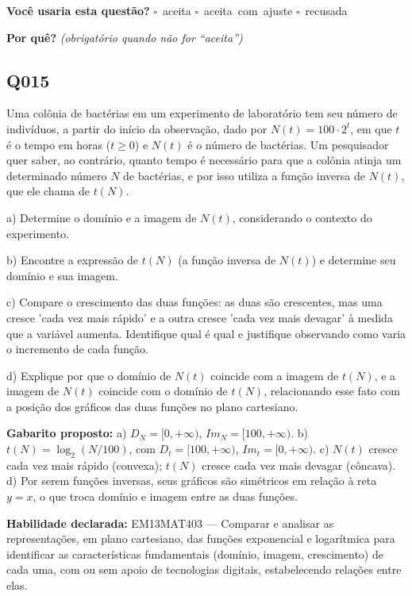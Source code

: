 \documentclass[11pt,a4paper]{article}
\begin{document}
\textbf{Você usaria esta questão?}\quad
\mbox{$\square$~aceita} \quad \mbox{$\square$~aceita com ajuste} \quad
\mbox{$\square$~recusada}

\textbf{Por quê?} \emph{(obrigatório quando não for ``aceita'')}

\underline{\hspace{\linewidth}}

\underline{\hspace{\linewidth}}
\vspace{0.6em}

\begin{samepage}
\subsection*{Q015}
Uma colônia de bactérias em um experimento de laboratório tem seu número de indivíduos, a partir do início da observação, dado por $N(t) = 100 \cdot 2^{t}$, em que $t$ é o tempo em horas ($t \geq 0$) e $N(t)$ é o número de bactérias. Um pesquisador quer saber, ao contrário, quanto tempo é necessário para que a colônia atinja um determinado número $N$ de bactérias, e por isso utiliza a função inversa de $N(t)$, que ele chama de $t(N)$.

a) Determine o domínio e a imagem de $N(t)$, considerando o contexto do experimento.

b) Encontre a expressão de $t(N)$ (a função inversa de $N(t)$) e determine seu domínio e sua imagem.

c) Compare o crescimento das duas funções: as duas são crescentes, mas uma cresce 'cada vez mais rápido' e a outra cresce 'cada vez mais devagar' à medida que a variável aumenta. Identifique qual é qual e justifique observando como varia o incremento de cada função.

d) Explique por que o domínio de $N(t)$ coincide com a imagem de $t(N)$, e a imagem de $N(t)$ coincide com o domínio de $t(N)$, relacionando esse fato com a posição dos gráficos das duas funções no plano cartesiano.

\textbf{Gabarito proposto:} a) $D_N=[0,+\infty)$, $Im_N=[100,+\infty)$. b) $t(N)=\log_2(N/100)$, com $D_t=[100,+\infty)$, $Im_t=[0,+\infty)$. c) $N(t)$ cresce cada vez mais rápido (convexa); $t(N)$ cresce cada vez mais devagar (côncava). d) Por serem funções inversas, seus gráficos são simétricos em relação à reta $y=x$, o que troca domínio e imagem entre as duas funções.

\textbf{Habilidade declarada:} EM13MAT403 --- Comparar e analisar as representações, em plano cartesiano, das funções exponencial e logarítmica para identificar as características fundamentais (domínio, imagem, crescimento) de cada uma, com ou sem apoio de tecnologias digitais, estabelecendo relações entre elas.
\end{samepage}
\end{document}
